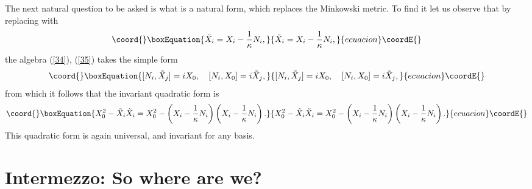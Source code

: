 \documentclass [prd,twocolumn,nofootinbib,showpacs]  {revtex4}
\begin{document}
The next natural question to be asked is what is a natural form,
which replaces the Minkowski metric.  To find it let us observe
that by replacing \coordHE{} with
\begin{equation}\coord{}\boxEquation{\label{tx}
\tilde{X}_i = X_i - \frac1\kappa N_i,
}{\tilde{X}_i = X_i - \frac1\kappa N_i,
}{ecuacion}\coordE{}\end{equation}
 the algebra (\ref{34}), (\ref{35}) takes the simple form
\begin{equation}\coord{}\boxEquation{\label{39}
[N_i, \tilde{X}_j] = i X_0, \quad [N_i, X_0]= i \tilde{X}_j,
}{[N_i, \tilde{X}_j] = i X_0, \quad [N_i, X_0]= i \tilde{X}_j,
}{ecuacion}\coordE{}\end{equation}
from which it follows that the invariant quadratic form is
\begin{equation}\coord{}\boxEquation{\label{40}
X_0^2 - \tilde{X}_i\tilde{X}_i = X_0^2 -\left(X_i - \frac1\kappa N_i\right)\left(X_i - \frac1\kappa N_i\right).
}{X_0^2 - \tilde{X}_i\tilde{X}_i = X_0^2 -\left(X_i - \frac1\kappa N_i\right)\left(X_i - \frac1\kappa N_i\right).
}{ecuacion}\coordE{}\end{equation}
This quadratic form is again universal, and invariant for any
basis.

\section{Intermezzo: So where are we?}
\end{document}
